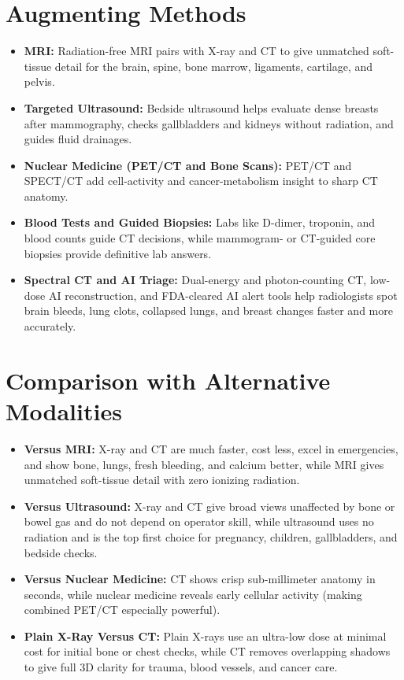 \section{Augmenting Methods}
\begin{itemize}
  \item \textbf{MRI:} Radiation-free MRI pairs with X-ray and CT to give unmatched soft-tissue detail for the brain, spine, bone marrow, ligaments, cartilage, and pelvis.
  \item \textbf{Targeted Ultrasound:} Bedside ultrasound helps evaluate dense breasts after mammography, checks gallbladders and kidneys without radiation, and guides fluid drainages.
  \item \textbf{Nuclear Medicine (PET/CT and Bone Scans):} PET/CT and SPECT/CT add cell-activity and cancer-metabolism insight to sharp CT anatomy.
  \item \textbf{Blood Tests and Guided Biopsies:} Labs like D-dimer, troponin, and blood counts guide CT decisions, while mammogram- or CT-guided core biopsies provide definitive lab answers.
  \item \textbf{Spectral CT and AI Triage:} Dual-energy and photon-counting CT, low-dose AI reconstruction, and FDA-cleared AI alert tools help radiologists spot brain bleeds, lung clots, collapsed lungs, and breast changes faster and more accurately.
\end{itemize}

\section{Comparison with Alternative Modalities}
\begin{itemize}
  \item \textbf{Versus MRI:} X-ray and CT are much faster, cost less, excel in emergencies, and show bone, lungs, fresh bleeding, and calcium better, while MRI gives unmatched soft-tissue detail with zero ionizing radiation.
  \item \textbf{Versus Ultrasound:} X-ray and CT give broad views unaffected by bone or bowel gas and do not depend on operator skill, while ultrasound uses no radiation and is the top first choice for pregnancy, children, gallbladders, and bedside checks.
  \item \textbf{Versus Nuclear Medicine:} CT shows crisp sub-millimeter anatomy in seconds, while nuclear medicine reveals early cellular activity (making combined PET/CT especially powerful).
  \item \textbf{Plain X-Ray Versus CT:} Plain X-rays use an ultra-low dose at minimal cost for initial bone or chest checks, while CT removes overlapping shadows to give full 3D clarity for trauma, blood vessels, and cancer care.
\end{itemize}

